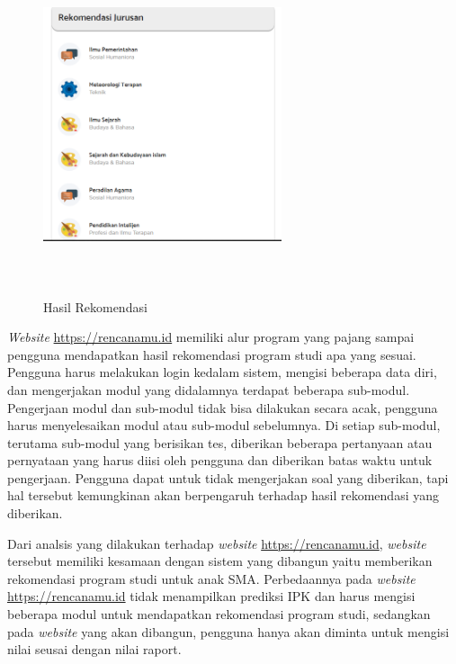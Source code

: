 \begin{enumerate}
    \begin{figure}[H]
        \centering
        \includegraphics[width = 7cm, height = 10cm ]{Gambar/gambar310.PNG}
        \caption{Hasil Rekomendasi}
        \label{fig:hasil rekomendasi}
    \end{figure}
    
\end{enumerate}

\textit{Website} \url{https://rencanamu.id} memiliki alur program yang pajang sampai pengguna mendapatkan hasil rekomendasi program studi apa yang sesuai. Pengguna harus melakukan login kedalam sistem, mengisi beberapa data diri, dan mengerjakan modul yang didalamnya terdapat beberapa sub-modul. Pengerjaan modul dan sub-modul tidak bisa dilakukan secara acak, pengguna harus menyelesaikan modul atau sub-modul sebelumnya. Di setiap sub-modul, terutama sub-modul yang berisikan tes, diberikan beberapa pertanyaan atau pernyataan yang harus diisi oleh pengguna dan diberikan batas waktu untuk pengerjaan. Pengguna dapat untuk tidak mengerjakan soal yang diberikan, tapi hal tersebut kemungkinan akan berpengaruh terhadap hasil rekomendasi yang diberikan. 

Dari analsis yang dilakukan terhadap \textit{website} \url{https://rencanamu.id}, \textit{website} tersebut memiliki kesamaan dengan sistem yang dibangun yaitu memberikan rekomendasi program studi untuk anak SMA. Perbedaannya pada \textit{website} \url{https://rencanamu.id} tidak menampilkan prediksi IPK dan harus mengisi beberapa modul untuk mendapatkan rekomendasi program studi, sedangkan pada \textit{website} yang akan dibangun, pengguna hanya akan diminta untuk mengisi nilai seusai dengan nilai raport.

